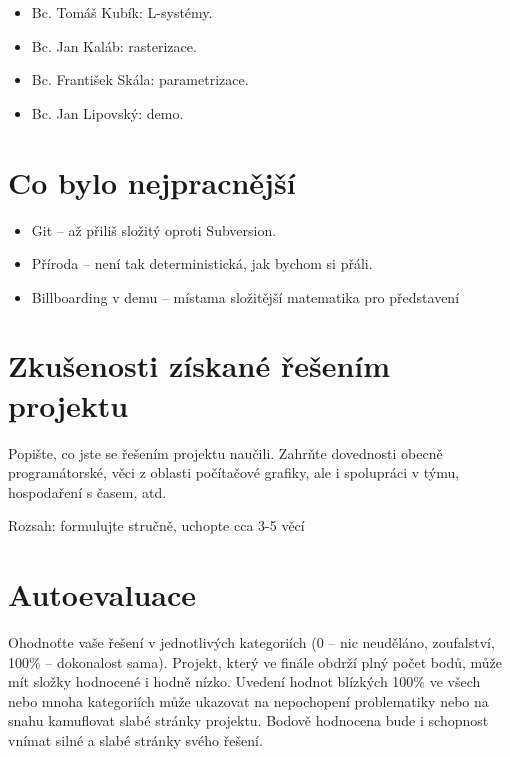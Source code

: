 \documentclass[11pt,a4paper]{article}
\begin{document}
\begin{itemize}
\begin{itemize}
\item Bc. Tomáš Kubík: L-systémy.
\item Bc. Jan Kaláb: rasterizace.
\item Bc. František Skála: parametrizace.
\item Bc. Jan Lipovský: demo.
\end{itemize}

\section{Co bylo nejpracnější}

%

\begin{itemize}
\item Git -- až přiliš složitý oproti Subversion.
\item Příroda -- není tak deterministická, jak bychom si přáli.
\item Billboarding v demu -- místama složitější matematika pro představení
\end{itemize}

\section{Zkušenosti získané řešením projektu}

Popište, co jste se řešením projektu naučili. Zahrňte dovednosti obecně
programátorské, věci z oblasti počítačové grafiky, ale i spolupráci v týmu,
hospodaření s časem, atd.

Rozsah: formulujte stručně, uchopte cca 3-5 věcí

\section{Autoevaluace}

Ohodnoťte vaše řešení v jednotlivých kategoriích (0 – nic neuděláno,
zoufalství, 100\% – dokonalost sama). Projekt, který ve finále obdrží plný
počet bodů, může mít složky hodnocené i hodně nízko. Uvedení hodnot blízkých
100\% ve všech nebo mnoha kategoriích může ukazovat na nepochopení problematiky
nebo na snahu kamuflovat slabé stránky projektu. Bodově hodnocena bude i
schopnost vnímat silné a slabé stránky svého řešení.


\end{itemize}
\end{document}
